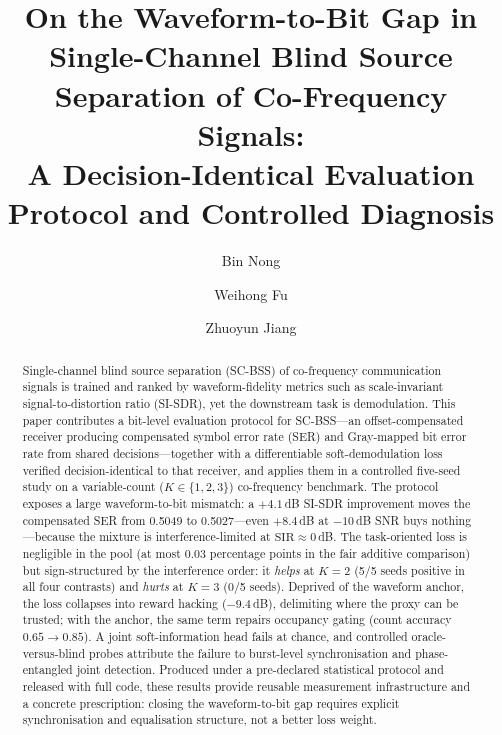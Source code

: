 \documentclass[review,12pt]{elsarticle}
\begin{document}
\begin{frontmatter}

\title{On the Waveform-to-Bit Gap in Single-Channel Blind Source
Separation of Co-Frequency Signals:\\A Decision-Identical Evaluation
Protocol and Controlled Diagnosis}

\author[1]{Bin Nong}
\author[2]{Weihong Fu}
\author[3]{Zhuoyun Jiang}



\begin{abstract}
Single-channel blind source separation (SC-BSS) of co-frequency
communication signals is trained and ranked by waveform-fidelity
metrics such as scale-invariant signal-to-distortion ratio (SI-SDR),
yet the downstream task is demodulation. This paper contributes a
bit-level evaluation protocol for SC-BSS---an offset-compensated
receiver producing compensated symbol error rate (SER) and Gray-mapped
bit error rate from shared decisions---together with a differentiable
soft-demodulation loss verified decision-identical to that receiver,
and applies them in a controlled five-seed study on a variable-count
($K \in \{1,2,3\}$) co-frequency benchmark. The protocol exposes a
large waveform-to-bit mismatch: a $+4.1$\,dB SI-SDR improvement moves
the compensated SER from 0.5049 to 0.5027---even $+8.4$\,dB at
$-10$\,dB SNR buys nothing---because the mixture is
interference-limited at $\mathrm{SIR} \approx 0$\,dB. The
task-oriented loss is negligible in the pool (at most 0.03 percentage
points in the fair additive comparison) but sign-structured by the
interference order: it \emph{helps} at $K{=}2$ (5/5 seeds positive in
all four contrasts) and \emph{hurts} at $K{=}3$ (0/5 seeds). Deprived
of the waveform anchor, the loss collapses into reward hacking
($-9.4$\,dB), delimiting where the proxy can be trusted; with the
anchor, the same term repairs occupancy gating (count accuracy $0.65
\rightarrow 0.85$). A joint soft-information head fails at chance, and
controlled oracle-versus-blind probes attribute the failure to
burst-level synchronisation and phase-entangled joint detection.
Produced under a pre-declared statistical protocol and released with
full code, these results provide reusable measurement infrastructure
and a concrete prescription: closing the waveform-to-bit gap requires
explicit synchronisation and equalisation structure, not a better loss
weight.
\end{abstract}


\end{frontmatter}
\end{document}
